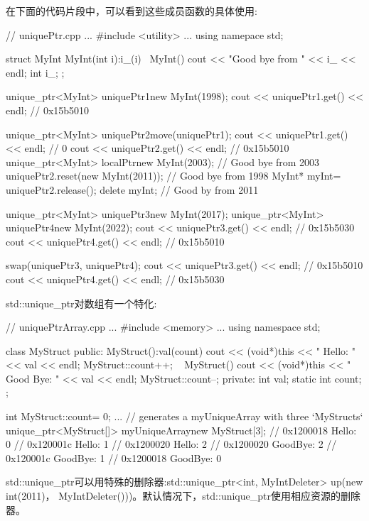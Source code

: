 在下面的代码片段中，可以看到这些成员函数的具体使用:


\begin{cpp}
// uniquePtr.cpp
...
#include <utility>
...
using namepace std;

struct MyInt{
	MyInt(int i):i_(i){}
	~MyInt(){
		cout << "Good bye from " << i_ << endl;
	}
	int i_;
};

unique_ptr<MyInt> uniquePtr1{new MyInt(1998)};
cout << uniquePtr1.get() << endl; // 0x15b5010

unique_ptr<MyInt> uniquePtr2{move(uniquePtr1)};
cout << uniquePtr1.get() << endl; // 0
cout << uniquePtr2.get() << endl; // 0x15b5010
{
	unique_ptr<MyInt> localPtr{new MyInt(2003)};
} // Good bye from 2003
uniquePtr2.reset(new MyInt(2011)); // Good bye from 1998
MyInt* myInt= uniquePtr2.release();
delete myInt; // Good by from 2011

unique_ptr<MyInt> uniquePtr3{new MyInt(2017)};
unique_ptr<MyInt> uniquePtr4{new MyInt(2022)};
cout << uniquePtr3.get() << endl; // 0x15b5030
cout << uniquePtr4.get() << endl; // 0x15b5010

swap(uniquePtr3, uniquePtr4);
cout << uniquePtr3.get() << endl; // 0x15b5010
cout << uniquePtr4.get() << endl; // 0x15b5030
\end{cpp}

std::unique\_ptr对数组有一个特化:


\begin{cpp}
// uniquePtrArray.cpp
...
#include <memory>
...
using namespace std;

class MyStruct{
	public:
	MyStruct():val(count){
		cout << (void*)this << " Hello: " << val << endl;
		MyStruct::count++;
	} ~
	MyStruct(){
		cout << (void*)this << " Good Bye: " << val << endl;
		MyStruct::count--;
	}
	private:
	int val;
	static int count;
};

int MyStruct::count= 0;
...
{
	// generates a myUniqueArray with three `MyStructs`
	unique_ptr<MyStruct[]> myUniqueArray{new MyStruct[3]};
}
// 0x1200018 Hello: 0
// 0x120001c Hello: 1
// 0x1200020 Hello: 2
// 0x1200020 GoodBye: 2
// 0x120001c GoodBye: 1
// 0x1200018 GoodBye: 0
\end{cpp}


std::unique\_ptr可以用特殊的删除器:std::unique\_ptr<int, MyIntDeleter> up(new int(2011)， MyIntDeleter()))。默认情况下，std::unique\_ptr使用相应资源的删除器。


